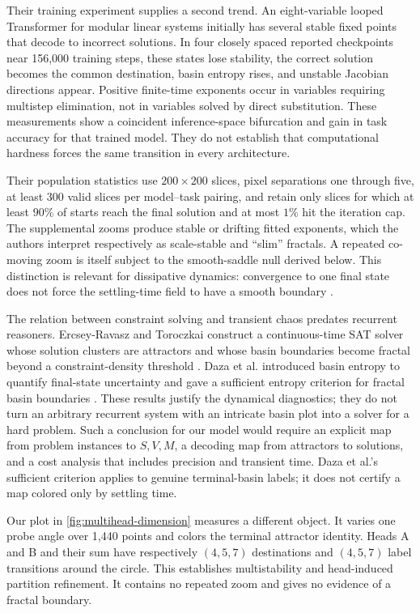 \documentclass[11pt,a4paper]{article}
\theoremstyle{definition}
\begin{document}
Their training experiment supplies a second trend.  An eight-variable looped
Transformer for modular linear systems initially has several stable fixed points that
decode to incorrect solutions.  In four closely spaced reported checkpoints near
156,000 training steps, these states lose stability, the correct solution becomes the
common destination, basin entropy rises, and unstable Jacobian directions appear.
Positive finite-time exponents occur in variables requiring multistep elimination,
not in variables solved by direct substitution.  These measurements show a
coincident inference-space bifurcation and gain in task accuracy for that trained
model.  They do not establish that computational hardness forces the same transition
in every architecture.

Their population statistics use $200\times200$ slices, pixel separations one through
five, at least 300 valid slices per model--task pairing, and retain only slices for
which at least $90\%$ of starts reach the final solution and at most $1\%$ hit the
iteration cap.  The supplemental zooms produce stable or drifting fitted exponents,
which the authors interpret respectively as scale-stable and ``slim'' fractals.  A
repeated co-moving zoom is itself subject to the smooth-saddle null derived below.
This distinction is relevant for dissipative dynamics: convergence to one final
state does not force the settling-time field to have a smooth boundary
\cite{motter2013doubly,chen2017slim}.

The relation between constraint solving and transient chaos predates recurrent
reasoners.  Ercsey-Ravasz and Toroczkai construct a continuous-time SAT solver whose
solution clusters are attractors and whose basin boundaries become fractal beyond a
constraint-density threshold \cite{ercseyravasz2011optimization}.  Daza et al.
introduced basin entropy to quantify final-state uncertainty and gave a sufficient
entropy criterion for fractal basin boundaries \cite{daza2016basin}.  These results
justify the dynamical diagnostics; they do not turn an arbitrary recurrent system
with an intricate basin plot into a solver for a hard problem.  Such a conclusion for
our model would require an explicit map from problem instances to $S,V,M$, a decoding
map from attractors to solutions, and a cost analysis that includes precision and
transient time.  Daza et al.'s sufficient criterion applies to genuine terminal-basin
labels; it does not certify a map colored only by settling time.

Our plot in \cref{fig:multihead-dimension} measures a different object.  It varies one
probe angle over 1,440 points and colors the terminal attractor identity.  Heads A and
B and their sum have respectively $(4,5,7)$ destinations and $(4,5,7)$ label
transitions around the circle.  This establishes multistability and head-induced
partition refinement.  It contains no repeated zoom and gives no evidence of a
fractal boundary.
\end{document}
